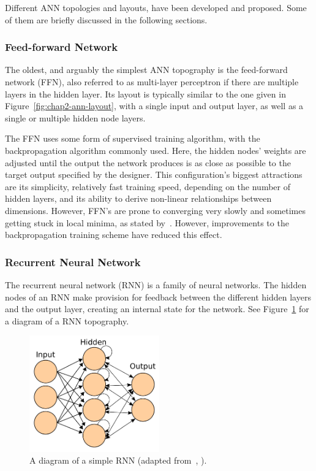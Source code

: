 Different ANN topologies and layouts, have been developed and proposed. Some of them are briefly discussed in the following sections.

\subsubsection{Feed-forward Network}

The oldest, and arguably the simplest ANN topography is the feed-forward network (FFN), also referred to as multi-layer perceptron if there are multiple layers in the hidden layer. Its layout is typically similar to the one given in Figure~\ref{fig:chap2-ann-layout}, with a single input and output layer, as well as a single or multiple hidden node layers. 

The FFN uses some form of supervised training algorithm, with the backpropagation algorithm commonly used. Here, the hidden nodes' weights are adjusted until the output the network produces is as close as possible to the target output specified by the designer. This configuration's biggest attractions are its simplicity, relatively fast training speed, depending on the number of hidden layers, and its ability to derive non-linear relationships between dimensions. However, FFN's are prone to converging very slowly and sometimes getting stuck in local minima, as stated by~\cite{svozil1997introduction}. However, improvements to the backpropagation training scheme have reduced this effect.

\subsubsection{Recurrent Neural Network}

The recurrent neural network (RNN) is a family of neural networks. The hidden nodes of an RNN make provision for feedback between the different hidden layers and the output layer, creating an internal state for the network. See Figure~\ref{fig:chap2-rnn-diagram} for a diagram of a RNN topography.

\begin{figure}
 \centering
 \includegraphics[width=0.5\textwidth]{figures/chapter2/rnn_diagram}
 \caption[A diagram of a simple RNN.]{A diagram of a simple RNN (adapted from~\citeauthor{ann-wiki-pic}, \citeyear{ann-wiki-pic}).}
\label{fig:chap2-rnn-diagram}
\end{figure}

